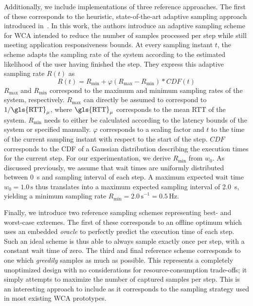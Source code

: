 Additionally, we include implementations of three reference approaches.
The first of these corresponds to the heuristic, state-of-the-art adaptive sampling approach introduced in~\cite{wang2019towards}.
In this work, the authors introduce an adaptive sampling scheme for \gls{WCA} intended to reduce the number of samples processed per step while still meeting application responsiveness bounds.
At every sampling instant \( t \), the scheme adapts the sampling rate of the system according to the estimated likelihood of the user having finished the step.
They express this adaptive sampling rate \( R(t) \) as
\begin{equation}
    R(t) = R_\text{min} + \varphi\left( R_\text{max} - R_\text{min} \right) * CDF(t)
\end{equation}
\( R_\text{max} \) and \( R_\text{min} \) correspond to the maximum and minimum sampling rates of the system, respectively.
\( R_\text{max} \) can directly be assumed to correspond to \( 1 / \text{\gls{RTT}}_\mu \), where \( \text{\gls{RTT}}_\mu \) corresponds to the mean \gls{RTT} of the system.
\( R_\text{min} \) needs to either be calculated according to the latency bounds of the system or specified manually.
\( \varphi \) corresponds to a scaling factor and \( t \) to the time of the current sampling instant with respect to the start of the step.
\( CDF \) corresponds to the \gls{CDF} of a Gaussian distribution describing the execution times for the current step.
For our experimentation, we derive \( R_\text{min} \) from \( w_0 \).
As discussed previously, we assume that wait times are uniformly distributed between \SI{0}{\second} and sampling interval of each step.
A maximum expected wait time \( w_0 = 1.0\,\si{\second} \) thus translates into a maximum expected sampling interval of \SI{2.0}{\second}, yielding a minimum sampling rate \( R_\text{min} = {2.0\,\si{\second}}^{-1} = 0.5\,\si{\hertz} \).

Finally, we introduce two reference sampling schemes representing best- and worst-case extremes.
The first of these corresponds to an offline optimum which uses an embedded \emph{oracle} to perfectly predict the execution time of each step.
Such an ideal scheme is thus able to always sample exactly once per step, with a constant wait time of zero.
The third and final reference scheme corresponds to one which \emph{greedily} samples as much as possible.
This represents a completely unoptimized design with no considerations for resource-consumption trade-offs; it simply attempts to maximize the number of captured samples per step.
This is an interesting approach to include as it corresponds to the sampling strategy used in most existing \gls{WCA} prototypes.

